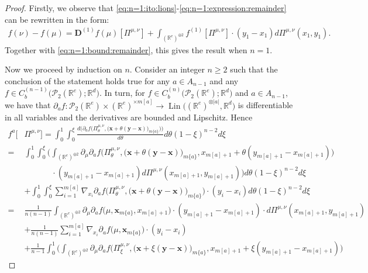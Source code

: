 \documentclass[a4paper,11pt,twoside]{article}
\numberwithin{equation}{section}
\theoremstyle{plain}
\newcommand{\bR}{\mathbb{R}}
\newcommand{\cP}{\mathcal{P}}
\newcommand{\rD}{\mathbf{D}}
\DeclareMathOperator{\lin}{Lin}
\newcommand{\1}{\mathbbm{1}}
\begin{document}
	\begin{proof}
		Firstly, we observe that \eqref{eq:n=1:ito:lions}-\eqref{eq:n=1:expression:remainder} can be rewritten in the form:
		\begin{align*}
			f(\nu) - f(\mu) =\rD^{(1)} f(\mu)[ \Pi^{\mu, \nu}] + \int_{(\bR^e)^{\oplus 2}} f^{(1)}[\Pi^{\mu, \nu}] \cdot (y_1-x_1) d\Pi^{\mu, \nu}(x_1, y_1). 
		\end{align*}
		Together with \eqref{eq:n=1:bound:remainder}, this gives the result when $n=1$.
		
		Now we proceed by induction on $n$. Consider an integer $n \geq 2$ such that the conclusion of the statement holds true for any $a\in A_{n-1}$ and any $f \in C_b^{(n-1)} \big( \cP_2(\bR^e); \bR^d \big)$. In turn, for $f \in C_b^{(n)} \big( \cP_2(\bR^e);\bR^d \big)$ and $a \in A_{n-1}$, we have that $\partial_a f: \cP_2(\bR^e) \times (\bR^e)^{\times m[a]} \to \lin\big( (\bR^e)^{\otimes |a|}, \bR^d \big)$ is differentiable in all variables and the derivatives are bounded and Lipschitz. Hence
		\begin{align*}
			f^{a}[&\Pi^{\mu, \nu}] = \int_0^1 \int_0^\xi \frac{d\bigg( \partial_a f\Big(\Pi^{\mu, \nu}_\theta, \big( \boldsymbol{x} + \theta(\boldsymbol{y}-\boldsymbol{x}) \big)_{m\{a\}} \Big) \bigg)}{d\theta} d\theta (1-\xi)^{n-2} d\xi
			\\
			=&\int_0^1 \int_0^\xi \bigg( \int_{(\bR^e)^{\oplus 2}} \partial_\mu \partial_a f\Big( \Pi_\theta^{\mu, \nu}, \big( \boldsymbol{x} + \theta(\boldsymbol{y}-\boldsymbol{x}) \big)_{m\{a\}},  x_{m[a]+1} + \theta(y_{m[a]+1} - x_{m[a]+1}) \Big) 
			\\
			& \hspace{40pt} \cdot (y_{m[a]+1} - x_{m[a]+1}) d\Pi^{\mu, \nu} (x_{m[a]+1}, y_{m[a]+1}) \bigg) d\theta (1-\xi)^{n-2} d\xi 
			\\
			&+\int_0^1 \int_0^\xi \sum_{i=1}^{m[a]} \nabla_{x_i} \partial_a f\Big( \Pi_\theta^{\mu, \nu}, \big(\boldsymbol{x} + \theta(\boldsymbol{y}-\boldsymbol{x})\big)_{m\{a\}} \Big) \cdot (y_i - x_i) d\theta (1-\xi)^{n-2} d\xi
			\\
			=&\tfrac{1}{n(n-1)} \int_{(\bR^e)^{\oplus 2}} \partial_\mu \partial_a f\Big( \mu, \boldsymbol{x}_{m\{a\}}, x_{m[a]+1} \Big) \cdot (y_{m[a]+1} - x_{m[a]+1}) \cdot d\Pi^{\mu, \nu}(x_{m[a]+1}, y_{m[a]+1}) 
			\\
			&+\tfrac{1}{n(n-1)} \sum_{i=1}^{m[a]} \nabla_{x_i} \partial_a f\Big( \mu, \boldsymbol{x}_{m\{a\}} \Big) \cdot (y_i - x_i) 
			\\
			&+ \tfrac{1}{n-1} \int_0^1 \bigg( \int_{(\bR^e)^{\oplus 2}} \partial_\mu \partial_a f\Big( \Pi_\xi^{\mu, \nu}, \big( \boldsymbol{x} + \xi( \boldsymbol{y} - \boldsymbol{x}) \big)_{m\{a\}}, x_{m[a]+1} + \xi( y_{m[a]+1} - x_{m[a]+1}) \Big) 

\end{align*}
\end{proof}
\end{document}
